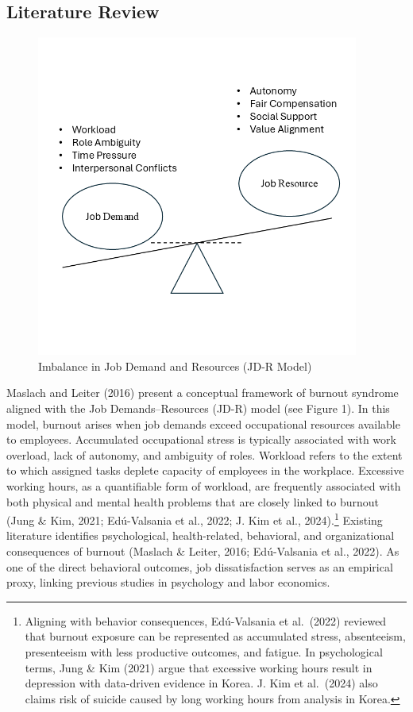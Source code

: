 \documentclass[
  12pt,
]{article}
\begin{document}
\subsection{Literature Review}\label{literature-review}

\begin{figure}
\centering
\includegraphics[width=4.16667in,height=\textheight,keepaspectratio]{Figure.png}
\caption{Imbalance in Job Demand and Resources (JD-R Model)}
\end{figure}

Maslach and Leiter (2016) present a conceptual framework of burnout
syndrome aligned with the Job Demands--Resources (JD-R) model (see
Figure 1). In this model, burnout arises when job demands exceed
occupational resources available to employees. Accumulated occupational
stress is typically associated with work overload, lack of autonomy, and
ambiguity of roles. Workload refers to the extent to which assigned
tasks deplete capacity of employees in the workplace. Excessive working
hours, as a quantifiable form of workload, are frequently associated
with both physical and mental health problems that are closely linked to
burnout (Jung \& Kim, 2021; Edú-Valsania et al., 2022; J. Kim et al.,
2024).\footnote{Aligning with behavior consequences, Edú-Valsania et
  al.~(2022) reviewed that burnout exposure can be represented as
  accumulated stress, absenteeism, presenteeism with less productive
  outcomes, and fatigue. In psychological terms, Jung \& Kim (2021)
  argue that excessive working hours result in depression with
  data-driven evidence in Korea. J. Kim et al.~(2024) also claims risk
  of suicide caused by long working hours from analysis in Korea.}
Existing literature identifies psychological, health-related,
behavioral, and organizational consequences of burnout (Maslach \&
Leiter, 2016; Edú-Valsania et al., 2022). As one of the direct
behavioral outcomes, job dissatisfaction serves as an empirical proxy,
linking previous studies in psychology and labor economics.
\end{document}

